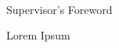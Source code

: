\newpage
~\\
\vspace{50pt}
\begin{center}
{\Large \sc Supervisor's Foreword \\ \rm}
\vspace{25pt}
\end{center}

Lorem Ipsum
